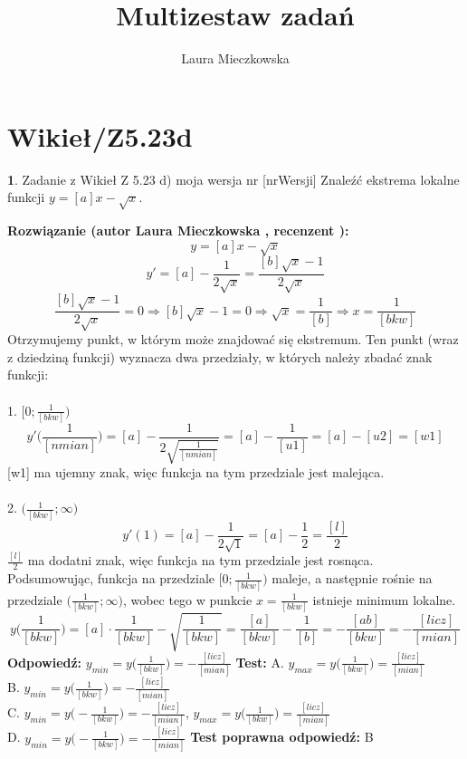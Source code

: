 \documentclass[12pt, a4paper]{article}
\title{Multizestaw zadań}
\author{Laura Mieczkowska}
\date{}
\theoremstyle{definition} %
\newtheorem{zad}{}
\newcommand{\kategoria}[1]{\section{#1}} %
\newcommand{\zadStart}[1]{\begin{zad}#1\newline} %
\newcommand{\zadStop}{\end{zad}}   %
\newcommand{\rozwStart}[2]{\noindent \textbf{Rozwiązanie (autor #1 , recenzent #2): }\newline} %
\newcommand{\odpStart}{\noindent \textbf{Odpowiedź:}\newline}    %
\newcommand{\odpStop}{\newline}                                             %
\newcommand{\testStart}{\noindent \textbf{Test:}\newline} %
\newcommand{\testStop}{\newline} %
\newcommand{\kluczStart}{\noindent \textbf{Test poprawna odpowiedź:}\newline} %
\newcommand{\kluczStop}{\newline} %
\begin{document}
\maketitle


\kategoria{Wikieł/Z5.23d}
\zadStart{Zadanie z Wikieł Z 5.23 d) moja wersja nr [nrWersji]}
Znaleźć ekstrema lokalne funkcji $y=[a]x-\sqrt{x}$.
\zadStop
\rozwStart{Laura Mieczkowska}{}
$$y=[a]x-\sqrt{x}$$
$$y'=[a]-\frac{1}{2\sqrt{x}}=\frac{[b]\sqrt{x}-1}{2\sqrt{x}}$$
$$\frac{[b]\sqrt{x}-1}{2\sqrt{x}}=0 \Rightarrow [b]\sqrt{x}-1=0 \Rightarrow \sqrt{x}=\frac{1}{[b]} \Rightarrow x=\frac{1}{[bkw]}$$
Otrzymujemy punkt, w którym może znajdować się ekstremum. Ten punkt (wraz z dziedziną funkcji) wyznacza dwa przedziały, w których należy zbadać znak funkcji:
\\\\1. $\bigg[0;\frac{1}{[bkw]}\bigg)$
$$y'\bigg(\frac{1}{[nmian]}\bigg)=[a]-\frac{1}{2\sqrt{\frac{1}{[nmian]}}}=[a]-\frac{1}{[u1]}=[a]-[u2]=[w1]$$
[w1] ma ujemny znak, więc funkcja na tym przedziale jest malejąca.
\\\\2. $\bigg(\frac{1}{[bkw]};\infty\bigg)$
$$y'(1)=[a]-\frac{1}{2\sqrt{1}}=[a]-\frac{1}{2}=\frac{[l]}{2}$$
$\frac{[l]}{2}$ ma dodatni znak, więc funkcja na tym przedziale jest rosnąca.
\\Podsumowując, funkcja na przedziale $\bigg[0;\frac{1}{[bkw]}\bigg)$ maleje, a następnie rośnie na przedziale $\bigg(\frac{1}{[bkw]};\infty\bigg)$, wobec tego w punkcie $x=\frac{1}{[bkw]}$ istnieje minimum lokalne.
$$y\bigg(\frac{1}{[bkw]}\bigg)=[a]\cdot\frac{1}{[bkw]}-\sqrt{\frac{1}{[bkw]}}=\frac{[a]}{[bkw]}-\frac{1}{[b]}=-\frac{[ab]}{[bkw]}=-\frac{[licz]}{[mian]}$$
\odpStart
$y_{min}=y\bigg(\frac{1}{[bkw]}\bigg)=-\frac{[licz]}{[mian]}$
\odpStop
\testStart
A. $y_{max}=y\big(\frac{1}{[bkw]}\big)=\frac{[licz]}{[mian]}$\\
B. $y_{min}=y\big(\frac{1}{[bkw]}\big)=-\frac{[licz]}{[mian]}$ \\
C. $y_{min}=y\big(-\frac{1}{[bkw]}\big)=-\frac{[licz]}{[mian]}$, $y_{max}=y\big(\frac{1}{[bkw]}\big)=\frac{[licz]}{[mian]}$ \\
D. $y_{min}=y\big(-\frac{1}{[bkw]}\big)=-\frac{[licz]}{[mian]}$ 
\testStop
\kluczStart
B
\kluczStop
\end{document}
